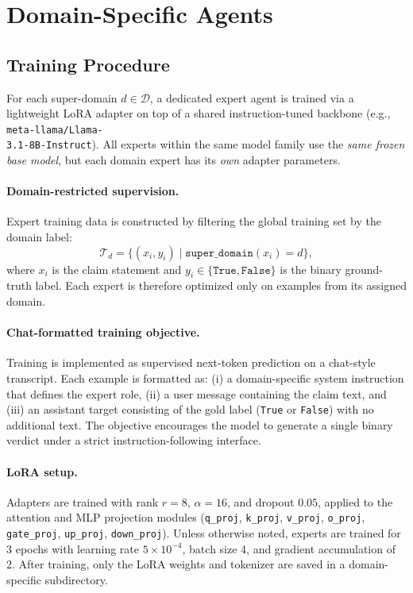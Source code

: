 \section{Domain-Specific Agents}

\subsection{Training Procedure}
For each super-domain $d \in \mathcal{D}$, a dedicated expert agent is trained via a lightweight LoRA adapter on top of a shared instruction-tuned backbone (e.g., \texttt{meta-llama/Llama-\\3.1-8B-Instruct}). All experts within the same model family use the \emph{same frozen base model}, but each domain expert has its \emph{own} adapter parameters.

\paragraph{Domain-restricted supervision.}
Expert training data is constructed by filtering the global training set by the domain label:
\[
\mathcal{T}_d = \{(x_i, y_i) \mid \texttt{super\_domain}(x_i)=d\},
\]
where $x_i$ is the claim statement and $y_i \in \{\texttt{True},\texttt{False}\}$ is the binary ground-truth label. Each expert is therefore optimized only on examples from its assigned domain.

\paragraph{Chat-formatted training objective.}
Training is implemented as supervised next-token prediction on a chat-style transcript. Each example is formatted as:
(i) a domain-specific system instruction that defines the expert role, 
(ii) a user message containing the claim text, and
(iii) an assistant target consisting of the gold label (\texttt{True} or \texttt{False}) with no additional text.
The objective encourages the model to generate a single binary verdict under a strict instruction-following interface.

\paragraph{LoRA setup.}
Adapters are trained with rank $r=8$, $\alpha=16$, and dropout $0.05$, applied to the attention and MLP projection modules (\texttt{q\_proj}, \texttt{k\_proj}, \texttt{v\_proj}, \texttt{o\_proj}, \texttt{gate\_proj}, \texttt{up\_proj}, \texttt{down\_proj}). Unless otherwise noted, experts are trained for 3 epochs with learning rate $5\times10^{-4}$, batch size 4, and gradient accumulation of 2. After training, only the LoRA weights and tokenizer are saved in a domain-specific subdirectory.

